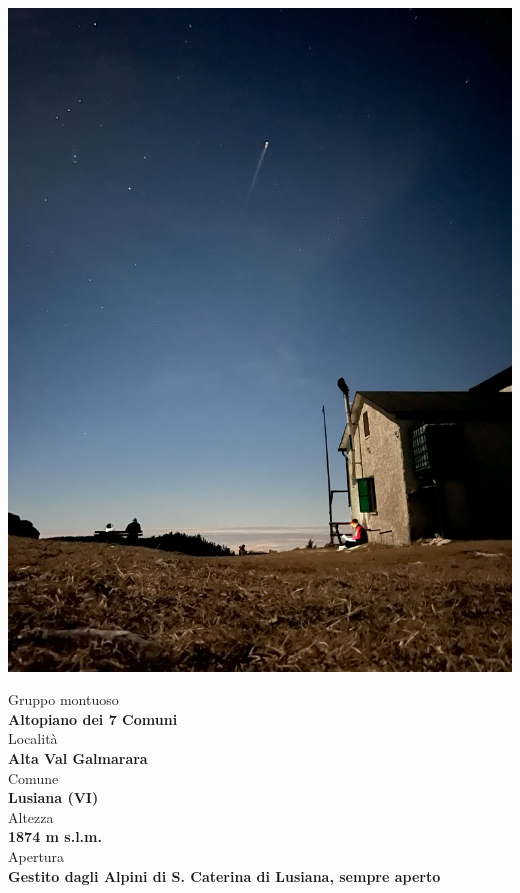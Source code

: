 \documentclass{article}
\begin{document}
\noindent
\begin{minipage}[t]{0.45\textwidth}
  \vspace{0pt} %
  \includegraphics[width=\linewidth]{images/bivacco.jpg}
\end{minipage}%
\hfill
\begin{minipage}[t]{0.5\textwidth}
  \vspace{0pt} %
  
  Gruppo montuoso\\
  \textbf{\large Altopiano dei 7 Comuni}
  \\[1em] %
  Località\\
  \textbf{\large Alta Val Galmarara}
  \\[1em] %
  Comune\\  
  \textbf{\large Lusiana (VI)}
  \\[1em] %
  Altezza\\  
  \textbf{\large 1874 m s.l.m.}
  \\[1em] %
  Apertura\\  
  \textbf{\large Gestito dagli Alpini di S. Caterina di Lusiana, sempre aperto}

\end{minipage}
\end{document}
